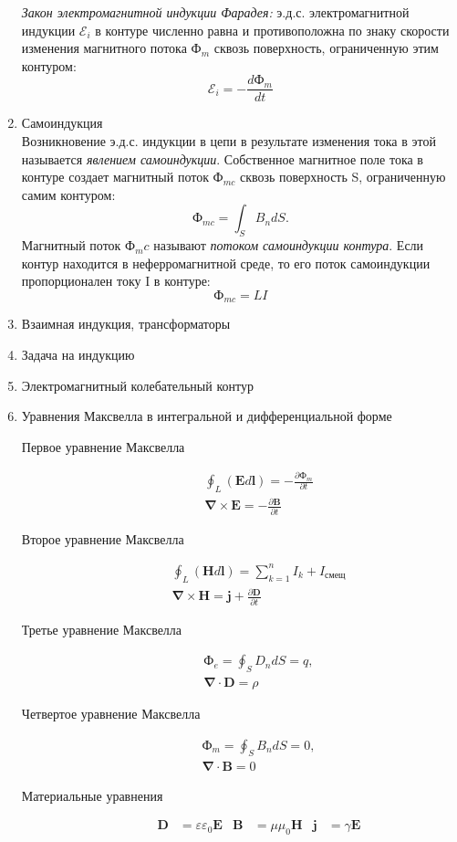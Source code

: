 \documentclass[11pt]{article}
\begin{document}
\begin{enumerate}
		\textit{Закон электромагнитной индукции Фарадея:} э.д.с. электромагнитной индукции $\mathcal{E}_i$ в контуре численно равна и противоположна по знаку скорости изменения магнитного потока $\text{Ф}_m$ сквозь поверхность, ограниченную этим контуром:
		$$
			\mathcal{E}_i = -\frac{d\text{Ф}_m}{dt}
		$$
		\item Самоиндукция\\
		Возникновение э.д.с. индукции в цепи в результате изменения тока в этой называется \textit{явлением самоиндукции}. Собственное магнитное поле тока в контуре создает магнитный поток $\text{Ф}_{mc}$ сквозь поверхность S, ограниченную самим контуром:
		$$
			\text{Ф}_{mc} = \int_S B_n dS.
		$$
		Магнитный поток $\text{Ф}_mc$ называют \textit{потоком самоиндукции контура}. Если контур находится в неферромагнитной среде, то его поток самоиндукции пропорционален току I в контуре:
		$$
			\text{Ф}_{mc} = LI
 		$$
		\item Взаимная индукция, трансформаторы\\
		\item Задача на индукцию\\
		\item Электромагнитный колебательный контур\\
		\item Уравнения Максвелла в интегральной и дифференциальной форме\\
		\begin{description}
			\item[Первое уравнение Максвелла]
			\begin{align}
				\oint_L (\mathbf{E}d\mathbf{l}) = -\frac{\partial\text{Ф}_m}{\partial t}\\
				\mathbf{\nabla\times E} = -\frac{\partial\mathbf{B}}{\partial t}
			\end{align}
			\item[Второе уравнение Максвелла]
			\begin{align}
				\oint_L (\mathbf{H}d\mathbf{l}) = \sum_{k=1}^n I_k + I_\text{смещ}\\
				\mathbf{\nabla\times H} = \mathbf{j} + \frac{\partial\mathbf{D}}{\partial t}
			\end{align}
			\item[Третье уравнение Максвелла]
			\begin{align}
				\text{Ф}_e = \oint_S D_n dS = q,\\
				\mathbf{\nabla\cdot D} = \rho
			\end{align}
			\item[Четвертое уравнение Максвелла]
			\begin{align}
				\text{Ф}_m = \oint_S B_n dS = 0,\\
				\mathbf{\nabla\cdot B} = 0
			\end{align}
			\item[Материальные уравнения]
			\begin{align}
				\mathbf{D} &= \varepsilon\varepsilon_0\mathbf{E} & \mathbf{B} &= \mu\mu_0\mathbf{H} & \mathbf{j} &= \gamma\mathbf{E} 
			\end{align}
		\end{description}
	\end{enumerate}
\end{document}
